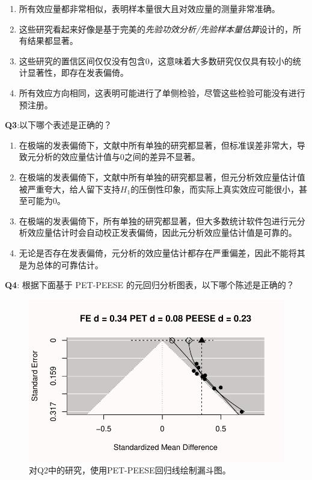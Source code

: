 \documentclass[
  letterpaper,
  DIV=11,
  numbers=noendperiod]{scrreprt}
\providecommand{\tightlist}{%
  \setlength{\itemsep}{0pt}\setlength{\parskip}{0pt}}\usepackage{longtable,booktabs,array}
\begin{document}
\begin{enumerate}
\def\labelenumi{\Alph{enumi})}
\tightlist
\item
  所有效应量都非常相似，表明样本量很大且对效应量的测量非常准确。
\item
  这些研究看起来好像是基于完美的\emph{先验功效分析/先验样本量估算}设计的，所有结果都显著。
\item
  这些研究的置信区间仅仅没有包含0，这意味着大多数研究仅仅具有较小的统计显著性，即存在发表偏倚。
\item
  所有效应方向相同，这表明可能进行了单侧检验，尽管这些检验可能没有进行预注册。
\end{enumerate}

\textbf{Q3}:以下哪个表述是正确的？

\begin{enumerate}
\def\labelenumi{\Alph{enumi})}
\tightlist
\item
  在极端的发表偏倚下，文献中所有单独的研究都显著，但标准误差非常大，导致元分析的效应量估计值与0之间的差异不显著。
\item
  在极端的发表偏倚下，文献中所有单独的研究都显著，但元分析效应量估计值被严重夸大，给人留下支持\(H_1\)的压倒性印象，而实际上真实效应可能很小，甚至可能为0。
\item
  在极端的发表偏倚下，所有单独的研究都显著，但大多数统计软件包进行元分析效应量估计时会自动校正发表偏倚，因此元分析效应量估计值是可靠的。
\item
  无论是否存在发表偏倚，元分析的效应量估计都存在严重偏差，因此不能将其是为总体的可靠估计。
\end{enumerate}

\textbf{Q4}: 根据下面基于 PET-PEESE
的元回归分析图表，以下哪个陈述是正确的？

\begin{figure}

{\centering \includegraphics[width=1\textwidth,height=\textheight]{12-bias_files/figure-pdf/fig-petpeeseq4-1.pdf}

}

\caption{\label{fig-petpeeseq4}对Q2中的研究，使用PET-PEESE回归线绘制漏斗图。}

\end{figure}
\end{document}
